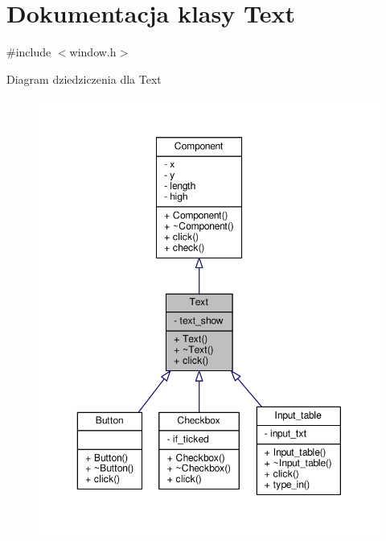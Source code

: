 \hypertarget{classText}{}\section{Dokumentacja klasy Text}
\label{classText}


{\ttfamily \#include $<$window.\+h$>$}



Diagram dziedziczenia dla Text\nopagebreak
\begin{figure}[H]
\begin{center}
\leavevmode
\includegraphics[width=350pt]{classText__inherit__graph}
\end{center}
\end{figure}


